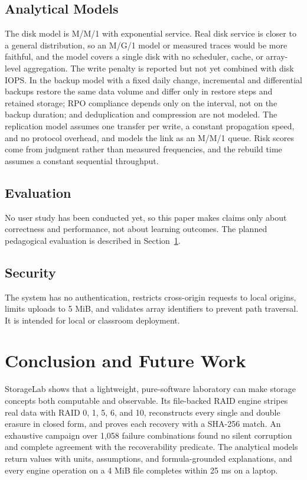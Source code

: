 \documentclass{ieeeaccess}
\begin{document}
\subsection{Analytical Models}
The disk model is M/M/1 with exponential service. Real disk service is closer to a general distribution, so an M/G/1 model or measured traces would be more faithful, and the model covers a single disk with no scheduler, cache, or array-level aggregation. The write penalty is reported but not yet combined with disk IOPS. In the backup model with a fixed daily change, incremental and differential backups restore the same data volume and differ only in restore steps and retained storage; RPO compliance depends only on the interval, not on the backup duration; and deduplication and compression are not modeled. The replication model assumes one transfer per write, a constant propagation speed, and no protocol overhead, and models the link as an M/M/1 queue. Risk scores come from judgment rather than measured frequencies, and the rebuild time assumes a constant sequential throughput.

\subsection{Evaluation}
No user study has been conducted yet, so this paper makes claims only about correctness and performance, not about learning outcomes. The planned pedagogical evaluation is described in Section~\ref{sec:concl}.

\subsection{Security}
The system has no authentication, restricts cross-origin requests to local origins, limits uploads to 5 MiB, and validates array identifiers to prevent path traversal. It is intended for local or classroom deployment.

\section{Conclusion and Future Work}
\label{sec:concl}
StorageLab shows that a lightweight, pure-software laboratory can make storage concepts both computable and observable. Its file-backed RAID engine stripes real data with RAID 0, 1, 5, 6, and 10, reconstructs every single and double erasure in closed form, and proves each recovery with a SHA-256 match. An exhaustive campaign over 1,058 failure combinations found no silent corruption and complete agreement with the recoverability predicate. The analytical models return values with units, assumptions, and formula-grounded explanations, and every engine operation on a 4 MiB file completes within 25 ms on a laptop.
\end{document}
